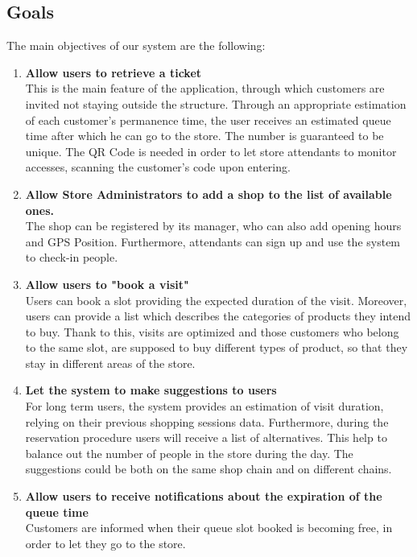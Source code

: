\documentclass[table, 12pt]{article}
\begin{document}
\begin{flushleft}
    \subsection{Goals}
    \label{goals}
    The main objectives of our system are the following:
    \begin{enumerate}[label=$\bullet$ \textbf{G\arabic*:}]
        \item \textbf{Allow users to retrieve a ticket}\\This is the main feature of the application, through which customers are invited not staying outside the structure. Through an appropriate estimation of each customer's permanence time, the user receives an estimated queue time after which he can go to the store. The number is guaranteed to be unique. The QR Code is needed in order to let store attendants to monitor accesses, scanning the customer's code upon entering.
        \item \textbf{Allow Store Administrators to add a shop to the list of available ones.}\\The shop can be registered by its manager, who can also add opening hours and GPS Position. Furthermore, attendants can sign up and use the system to check-in people.
        \item \textbf{Allow users to "book a visit"}\\Users can book a slot providing the expected duration of the visit. Moreover, users can provide a list which describes the categories of products they intend to buy. Thank to this, visits are optimized and those customers who belong to the same slot, are supposed to buy different types of product, so that they stay in different areas of the store.
        \item \textbf{Let the system to make suggestions to users}\\For long term users, the system provides an estimation of visit duration, relying on their previous shopping sessions data. Furthermore, during the reservation procedure users will receive a list of alternatives. This help to balance out the number of people in the store during the day. The suggestions could be both on the same shop chain and on different chains.
        \item \textbf{Allow users to receive notifications about the expiration of the queue time}\\Customers are informed when their queue slot booked is becoming free, in order to let they go to the store.
    \end{enumerate}

\end{flushleft}
\end{document}
